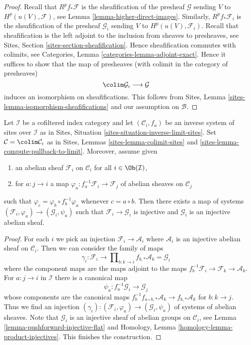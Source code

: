 \begin{proof}
Recall that $R^pf_*\mathcal{F}$ is the sheafification of the presheaf
$\mathcal{G}$ sending $V$ to $H^p(u(V), \mathcal{F})$, see
Lemma \ref{lemma-higher-direct-images}. Similarly, 
$R^pf_*\mathcal{F}_i$ is the sheafification of the presheaf
$\mathcal{G}_i$ sending $V$ to $H^p(u(V), \mathcal{F}_i)$.
Recall that sheafification is the left adjoint to the inclusion
from sheaves to presheaves, see Sites, Section
\ref{sites-section-sheafification}. Hence sheafification commutes
with colimits, see Categories, Lemma \ref{categories-lemma-adjoint-exact}.
Hence it suffices to show that the map of presheaves (with colimit
in the category of presheaves)
$$
\colim \mathcal{G}_i \longrightarrow \mathcal{G}
$$
induces an isomorphism on sheafifications. This follows from
Sites, Lemma \ref{sites-lemma-isomorphism-sheafifications} and
our assumption on $\mathcal{B}$.
\end{proof}

\begin{lemma}
\label{lemma-colim-sites-injective}
Let $\mathcal{I}$ be a cofiltered index category and let
$(\mathcal{C}_i, f_a)$ be an inverse system of sites over $\mathcal{I}$
as in Sites, Situation \ref{sites-situation-inverse-limit-sites}.
Set $\mathcal{C} = \colim \mathcal{C}_i$ as in Sites,
Lemmas \ref{sites-lemma-colimit-sites} and
\ref{sites-lemma-compute-pullback-to-limit}.
Moreover, assume given
\begin{enumerate}
\item an abelian sheaf $\mathcal{F}_i$ on $\mathcal{C}_i$ for all
$i \in \Ob(\mathcal{I})$,
\item for $a : j \to i$ a map
$\varphi_a : f_a^{-1}\mathcal{F}_i \to \mathcal{F}_j$
of abelian sheaves on $\mathcal{C}_j$
\end{enumerate}
such that $\varphi_c = \varphi_b \circ f_b^{-1}\varphi_a$
whenever $c = a \circ b$. Then there exists a map of systems
$(\mathcal{F}_i, \varphi_a) \to (\mathcal{G}_i, \psi_a)$
such that $\mathcal{F}_i \to \mathcal{G}_i$ is injective and
$\mathcal{G}_i$ is an injective abelian sheaf.
\end{lemma}

\begin{proof}
For each $i$ we pick an injection $\mathcal{F}_i \to \mathcal{A}_i$
where $\mathcal{A}_i$ is an injective abelian sheaf on $\mathcal{C}_i$.
Then we can consider the family of maps
$$
\gamma_i :
\mathcal{F}_i
\longrightarrow
\prod\nolimits_{b : k \to i} f_{b, *}\mathcal{A}_k = \mathcal{G}_i
$$
where the component maps are the maps adjoint to the maps
$f_b^{-1}\mathcal{F}_i \to \mathcal{F}_k \to \mathcal{A}_k$.
For $a : j \to i$ in $\mathcal{I}$ there is a canonical map
$$
\psi_a : f_a^{-1}\mathcal{G}_i \to \mathcal{G}_j
$$
whose components are the canonical maps
$f_b^{-1}f_{a \circ b, *}\mathcal{A}_k \to f_{b, *}\mathcal{A}_k$
for $b : k \to j$. Thus we find an injection
$(\gamma_i) : (\mathcal{F}_i, \varphi_a) \to (\mathcal{G}_i, \psi_a)$
of systems of abelian sheaves. Note that $\mathcal{G}_i$ is an injective
sheaf of abelian groups on $\mathcal{C}_i$, see
Lemma \ref{lemma-pushforward-injective-flat} and
Homology, Lemma \ref{homology-lemma-product-injectives}.
This finishes the construction.
\end{proof}

